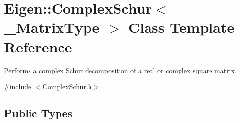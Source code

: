 \hypertarget{class_eigen_1_1_complex_schur}{}\section{Eigen\+::Complex\+Schur$<$ \+\_\+\+Matrix\+Type $>$ Class Template Reference}
\label{class_eigen_1_1_complex_schur}


Performs a complex Schur decomposition of a real or complex square matrix.  




{\ttfamily \#include $<$Complex\+Schur.\+h$>$}

\subsection*{Public Types}
